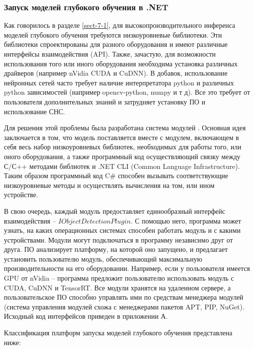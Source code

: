 \subsubsection{Запуск моделей глубокого обучения в .NET}

Как говорилось в разделе \ref{sect-7-1}, для высокопроизводительного инференса моделей глубокого обучения требуются низкоуровневые библиотеки. Эти библиотеки спроектированы для разного оборудования и имеют различные интерфейсы взаимодействия (API). Также, зачастую, для возможности использования того или иного оборудования необходима установка различных драйверов (например nVidia CUDA и CuDNN). В добавок, использование нейронных сетей часто требует наличие интерпретатора python и различных python зависимостей (например opencv-python, numpy и т д). Все это требует от пользователя дополнительных знаний и затрудняет установку ПО и использование СНС.

Для решения этой проблемы была разработана система модулей \cite{lib-plugins}. Основная идея заключается в том, что модель поставляется вместе с модулем, включающем в себя весь набор низкоуровневых библиотек, необходимых для работы того, или оного оборудования, а также программный код осуществляющий связку между С\slash С++ методами библиотек и .NET CLI (Common Language Infrastructure). Таким образом программный код C\# способен вызывать соответствующие низкоуровневые методы и осуществлять вычисления на том, или ином устройстве.

В свою очередь, каждый модуль предоставляет единообразный интерфейс взаимодействия -- $IObjectDetectionPlugin$. С помощью него, программа может узнать, на каких операционных системах способен работать модуль и с какими устройствами. Модули могут подключаться в программу независимо друг от друга. ПО анализирует платформу, на которой оно запущено, и предлагает установить пользователю модуль, обеспечивающий максимальную производительности на его оборудовании. Например, если у пользователя имеется GPU от nVidia -- программа предложит пользователю использовать модуль с CUDA, CuDNN и TensorRT. Все модули хранятся на удаленном сервере, а пользовательское ПО способно управлять ими по средствам менеджера модулей (система управления модулей схожа с менеджерами пакетов APT, PIP, NuGet). Исходный код интерфейсов приведен в приложении А.

Классификация платформ запуска моделей глубокого обучения представлена ниже:

